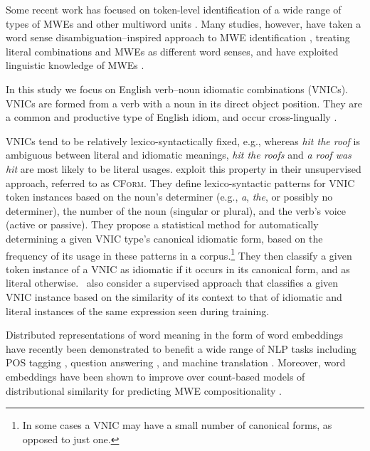 \documentclass[11pt]{article}
\newcommand{\cform}{\textsc{CForm}\xspace}
\newcommand{\VNIC}{VNIC\xspace}
\newcommand{\VNICs}{VNICs\xspace}
\begin{document}
Some recent work has focused on token-level identification of a wide
range of types of MWEs and other multiword units
\citep[e.g.,][]{Newman+:2012,Schneider+:2014,Brooke+:2014}. Many
studies, however, have taken a word sense disambiguation--inspired
approach to MWE identification
\citep[e.g.,][]{Birke2006,Katz2006,Li+:2010}, treating literal
combinations and MWEs as different word senses, and have exploited
linguistic knowledge of MWEs
\citep[e.g.,][]{Patrick2005,Uchiyama2005,Hashimoto:Kawahara:2008,Fazly2009,Fothergill:Baldwin:2012}.


In this study we focus on English verb--noun idiomatic combinations
(\VNICs). \VNICs are formed from a verb with a noun in its direct object
position. They are a common and productive type of English idiom, and
occur cross-lingually \citep{Fazly2009}.

\VNICs tend to be relatively lexico-syntactically fixed, e.g., whereas
\emph{hit the roof} is ambiguous between literal and idiomatic
meanings, \emph{hit the roofs} and \emph{a roof was hit} are most
likely to be literal usages. \cite{Fazly2009} exploit this property in
their unsupervised approach, referred to as \cform. They define
lexico-syntactic patterns for \VNIC token instances based on the
noun's determiner (e.g., \emph{a}, \emph{the}, or possibly no
determiner), the number of the noun (singular or plural), and the
verb's voice (active or passive). They propose a statistical method
for automatically determining a given \VNIC type's canonical idiomatic
form, based on the frequency of its usage in these patterns in a
corpus.\footnote{In some cases a \VNIC may have a small number of
  canonical forms, as opposed to just one.} They then classify a given
token instance of a \VNIC as idiomatic if it occurs in its canonical
form, and as literal otherwise. \citeauthor{Fazly2009}\ also consider a
supervised approach that classifies a given \VNIC instance based on
the similarity of its context to that of idiomatic and literal
instances of the same expression seen during training.

Distributed representations of word meaning in the form of word
embeddings \citep{Mikolov+:2013b} have recently been demonstrated to
benefit a wide range of NLP tasks including POS tagging
\citep[e.g.,][]{ling2015not}, question answering
\citep[e.g.,][]{dong2015question}, and machine translation
\citep[e.g.,][]{Zou+:2013}. Moreover, word embeddings have been shown
to improve over count-based models of distributional similarity for
predicting MWE compositionality \citep{Salehi+:2015}.
\end{document}
